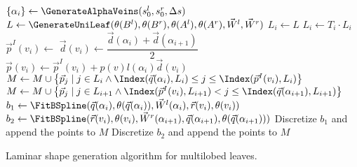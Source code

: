 \let\vect\vec

\begin{SgAlgorithm}[t]
    \BlankLine
    \BlankLine
    $\{\alpha_i\} \leftarrow \GenerateAlphaVeins(s_0^l, s_0^r, \Delta s)$ \;
    $L\leftarrow \GenerateUniLeaf(\theta(B^l), \theta(B^r), \theta(A^l), \theta(A^r), \vect{W}^l, \vect{W}^r)$ \;
    \BlankLine
    {%
        $L_i \leftarrow L$ \;
        $L_i \leftarrow T_i\cdot L_i$ \;
    }
    \BlankLine
    {%
        $\vect{p}^I(v_i) \leftarrow$  \;
        $\vect{d}(v_i) \leftarrow \dfrac{\vect{d}(\alpha_i) + \vect{d}(\alpha_{i+1})}{2}$ \;
        {%
            $\vect{p}(v_i) \leftarrow  \vect{p}^I(v_i) + p(v) l(\alpha_i) \vect{d}(v_i)$ \;
        }
    }
    \BlankLine
    {%
        {%
            $M \leftarrow M \cup \left\{\vect{p}_j \mid j \in L_i \wedge \Index(\vect{q}(\alpha_i), L_i) \leq j \leq \Index(\vect{p}^I(v_i), L_i) \right\}$ \;
          $M \leftarrow M \cup \left\{\vect{p}_j \mid j \in L_{i+1} \wedge \Index(\vect{p}^I(v_i), L_{i+1}) < j \leq \Index(\vect{q}(\alpha_{i+1}), L_{i+1})\right\}$ \;
        }
        {%
           $b_1 \leftarrow \FitBSpline(\vect{q}(\alpha_i), \theta(\vect{q}(\alpha_i)), \vect{W}^l(\alpha_i), \vect{r}(v_i), \theta(v_i))$ \;
            $b_2 \leftarrow \FitBSpline(\vect{r}(v_i), \theta(v_i), \vect{W}^r(\alpha_{i+1}), \vect{q}(\alpha_{i+1}), \theta(\vect{q}(\alpha_{i+1})))$ \;
            Discretize $b_1$ and append the points to $M$ \;
            Discretize $b_2$ and append the points to $M$ \;
        }
    }
    \caption[Laminar shape generation algorithm for multilobed leaves]{Laminar shape generation algorithm for multilobed leaves.}
    \label{algo:Ch6-ShapeGen}
\end{SgAlgorithm}